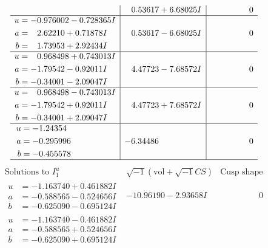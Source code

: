 \documentclass[1p]{elsarticle_modified}
\theoremstyle{definition}
\newcommand{\I}{\sqrt{-1}}
\begin{document}
$$\begin{array}{c|c|c}
 & \phantom{-}0.53617 + 6.68025 I & \phantom{-0.000000 } 0 \\ \hline\begin{aligned}
u &= -0.976002 - 0.728365 I \\
a &= \phantom{-}2.62210 + 0.71878 I \\
b &= \phantom{-}1.73953 + 2.92434 I\end{aligned}
 & \phantom{-}0.53617 - 6.68025 I & \phantom{-0.000000 } 0 \\ \hline\begin{aligned}
u &= \phantom{-}0.968498 + 0.743013 I \\
a &= -1.79542 - 0.92011 I \\
b &= -0.34001 - 2.09047 I\end{aligned}
 & \phantom{-}4.47723 - 7.68572 I & \phantom{-0.000000 } 0 \\ \hline\begin{aligned}
u &= \phantom{-}0.968498 - 0.743013 I \\
a &= -1.79542 + 0.92011 I \\
b &= -0.34001 + 2.09047 I\end{aligned}
 & \phantom{-}4.47723 + 7.68572 I & \phantom{-0.000000 } 0 \\ \hline\begin{aligned}
u &= -1.24354\phantom{ +0.000000I} \\
a &= -0.295996\phantom{ +0.000000I} \\
b &= -0.455578\phantom{ +0.000000I}\end{aligned}
 & -6.34486\phantom{ +0.000000I} & \phantom{-0.000000 } 0\\
 \hline 
 \end{array}$$\newpage$$\begin{array}{c|c|c}  
\text{Solutions to }I^u_{1}& \I (\text{vol} + \sqrt{-1}CS) & \text{Cusp shape}\\
 \hline 
\begin{aligned}
u &= -1.163740 + 0.461882 I \\
a &= -0.588565 - 0.524656 I \\
b &= -0.625090 - 0.695124 I\end{aligned}
 & -10.96190 - 2.93658 I & \phantom{-0.000000 } 0 \\ \hline\begin{aligned}
u &= -1.163740 - 0.461882 I \\
a &= -0.588565 + 0.524656 I \\
b &= -0.625090 + 0.695124 I\end{aligned}

\end{array}$$
\end{document}
